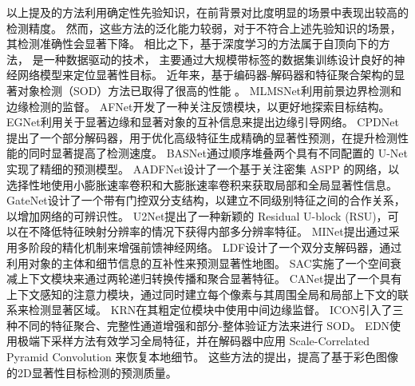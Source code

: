 



以上提及的方法利用确定性先验知识，在前背景对比度明显的场景中表现出较高的检测精度。
然而，这些方法的泛化能力较弱，对于不符合上述先验知识的场景，其检测准确性会显著下降。
相比之下，基于深度学习的方法属于自顶向下的方法，
是一种数据驱动的技术，
主要通过大规模带标签的数据集训练设计良好的神经网络模型来定位显著性目标。
近年来，基于编码器-解码器和特征聚合架构的显著对象检测（SOD）方法已取得了很高的性能
。
MLMSNet利用前景边界检测和边缘检测的监督。
AFNet开发了一种关注反馈模块，以更好地探索目标结构。
EGNet利用关于显著边缘和显著对象的互补信息来提出边缘引导网络。
CPDNet提出了一个部分解码器，用于优化高级特征生成精确的显著性预测，在提升检测性能的同时显著提高了检测速度。
BASNet通过顺序堆叠两个具有不同配置的
U-Net实现了精细的预测模型。
AADFNet设计了一个基于关注密集 ASPP 的网络，以选择性地使用小膨胀速率卷积和大膨胀速率卷积来获取局部和全局显著性信息。
GateNet设计了一个带有门控双分支结构，以建立不同级别特征之间的合作关系，以增加网络的可辨识性。
U2Net提出了一种新颖的 Residual U-block (RSU)，可以在不降低特征映射分辨率的情况下获得内部多分辨率特征。
MINet提出通过采用多阶段的精化机制来增强前馈神经网络。
LDF设计了一个双分支解码器，通过利用对象的主体和细节信息的互补性来预测显著性地图。
SAC实施了一个空间衰减上下文模块来通过两轮递归转换传播和聚合显著特征。
CANet提出了一个具有上下文感知的注意力模块，通过同时建立每个像素与其周围全局和局部上下文的联系来检测显著区域。
KRN在其粗定位模块中使用中间边缘监督。
ICON引入了三种不同的特征聚合、完整性通道增强和部分-整体验证方法来进行 SOD。
EDN使用极端下采样方法有效学习全局特征，并在解码器中应用 Scale-Correlated Pyramid Convolution 来恢复本地细节。
这些方法的提出，提高了基于彩色图像的2D显著性目标检测的预测质量。







